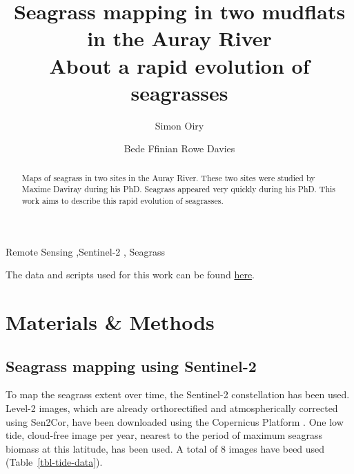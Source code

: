 \documentclass[
  number]{elsarticle}
\begin{document}
\begin{frontmatter}
\title{Seagrass mapping in two mudflats in the Auray
River \\\large{About a rapid evolution of seagrasses} }
\author[1]{Simon Oiry%
%
}
\author[1]{Bede Ffinian Rowe Davies%
%
}




        
\begin{abstract}
Maps of seagrass in two sites in the Auray River. These two sites were
studied by Maxime Daviray during his PhD. Seagrass appeared very quickly
during his PhD. This work aims to describe this rapid evolution of
seagrasses.
\end{abstract}





\begin{keyword}
    Remote Sensing \sep Sentinel-2 \sep 
    Seagrass
\end{keyword}
\end{frontmatter}
    
The data and scripts used for this work can be found
\href{https://github.com/SigOiry/Seagrass_maps_Maxime}{here}.

\section{Materials \& Methods}\label{materials-methods}

\subsection{Seagrass mapping using
Sentinel-2}\label{seagrass-mapping-using-sentinel-2}

To map the seagrass extent over time, the Sentinel-2 constellation has
been used. Level-2 images, which are already orthorectified and
atmospherically corrected using Sen2Cor, have been downloaded using the
Copernicus Platform \citep{Copernicus_Sentinel}. One low tide,
cloud-free image per year, nearest to the period of maximum seagrass
biomass at this latitude, has been used. A total of 8 images have beed
used (Table~\ref{tbl-tide-data}).
\end{document}
